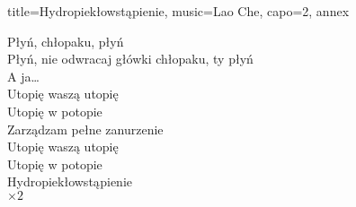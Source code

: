 \begin{song}{title={Hydropiekłowstąpienie}, music={Lao Che}, capo=2, annex}
\begin{multicols}{2}
    \begin{chorus}
        Płyń, chłopaku, płyń \\
        Płyń, nie odwracaj główki chłopaku, ty płyń \\
        A ja\ldots \smallskip \\
        Utopię waszą utopię \\
        Utopię w potopie \\
        Zarządzam pełne zanurzenie \smallskip \\
        Utopię waszą utopię \\
        Utopię w potopie \\
        Hydropiekłowstąpienie \medskip \\
            $\times 2$
    \end{chorus}
    \end{multicols}
\end{song}

